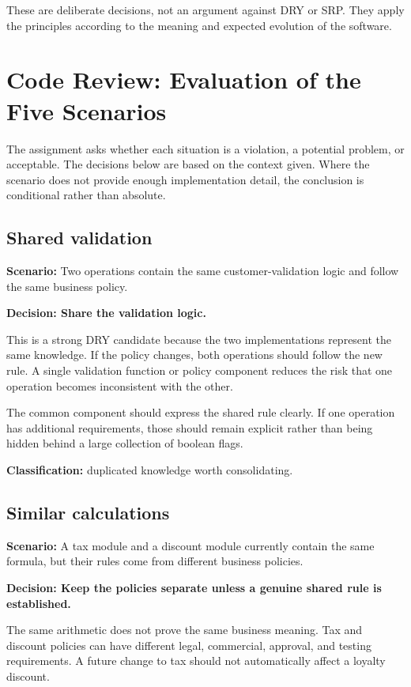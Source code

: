 \documentclass[12pt,a4paper]{article}
\begin{document}
These are deliberate decisions, not an argument against DRY or SRP. They apply the principles according to the meaning and expected evolution of the software.

\section{Code Review: Evaluation of the Five Scenarios}

The assignment asks whether each situation is a violation, a potential problem, or acceptable. The decisions below are based on the context given. Where the scenario does not provide enough implementation detail, the conclusion is conditional rather than absolute.

\subsection{Shared validation}

\textbf{Scenario:} Two operations contain the same customer-validation logic and follow the same business policy.

\textbf{Decision: Share the validation logic.}

This is a strong DRY candidate because the two implementations represent the same knowledge. If the policy changes, both operations should follow the new rule. A single validation function or policy component reduces the risk that one operation becomes inconsistent with the other.

The common component should express the shared rule clearly. If one operation has additional requirements, those should remain explicit rather than being hidden behind a large collection of boolean flags.

\textbf{Classification:} duplicated knowledge worth consolidating.

\subsection{Similar calculations}

\textbf{Scenario:} A tax module and a discount module currently contain the same formula, but their rules come from different business policies.

\textbf{Decision: Keep the policies separate unless a genuine shared rule is established.}

The same arithmetic does not prove the same business meaning. Tax and discount policies can have different legal, commercial, approval, and testing requirements. A future change to tax should not automatically affect a loyalty discount.
\end{document}
